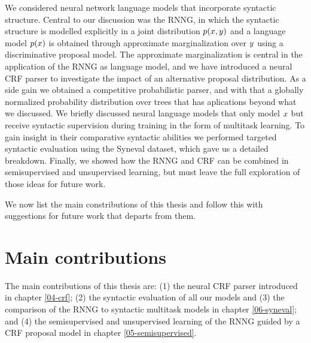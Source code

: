 We considered neural network language models that incorporate syntactic structure. Central to our discussion was the RNNG, in which the syntactic structure is modelled explicitly in a joint distribution $p( x, y )$ and a language model $p(x)$ is obtained through approximate marginalization over $y$ using a discriminative proposal model. The approximate marginalization is central in the application of the RNNG as language model, and we have introduced a neural CRF parser to investigate the impact of an alternative proposal distribution. As a side gain we obtained a competitive probabilistic parser, and with that a globally normalized probability distribution over trees that has aplications beyond what we discussed. We briefly discussed neural language models that only model $x$ but receive syntactic supervision during training in the form of multitask learning. To gain insight in their comparative syntactic abilities we performed targeted syntactic evaluation using the Syneval dataset, which gave us a detailed breakdown. Finally, we showed how the RNNG and CRF can be combined in semisupervised and unsupervised learning, but must leave the full exploration of those ideas for future work.

We now list the main constributions of this thesis and follow this with suggestions for future work that departs from them.

\section{Main contributions}
  The main contributions of this thesis are: (1) the neural CRF parser introduced in chapter \ref{04-crf}; (2) the syntactic evaluation of all our models and (3) the comparison of the RNNG to syntactic multitask models in chapter \ref{06-syneval}; and (4) the semisupervised and unsupervised learning of the RNNG guided by a CRF proposal model in chapter \ref{05-semisupervised}.

